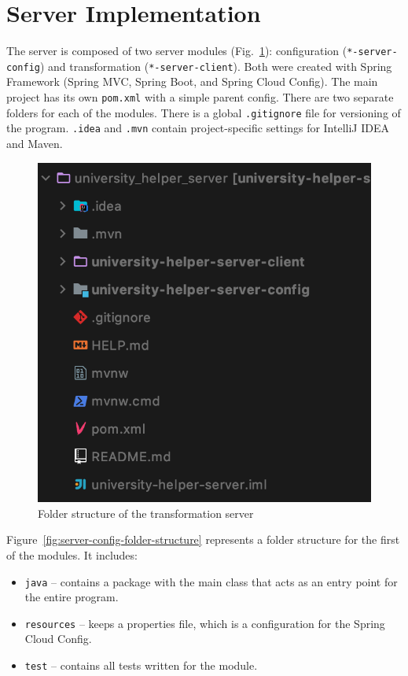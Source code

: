

\section{Server Implementation}
The server is composed of two server modules (Fig.~\ref{fig:server-folder-structure}): configuration (\texttt{*-server-config}) and transformation (\texttt{*-server-client}). Both were created with Spring Framework (Spring MVC, Spring Boot, and Spring Cloud Config). The main project has its own \texttt{pom.xml} with a simple parent config. There are two separate folders for each of the modules. There is a global \texttt{.gitignore} file for versioning of the program. \texttt{.idea} and \texttt{.mvn} contain project-specific settings for IntelliJ IDEA and Maven.

\begin{figure}[htb]
    \centering
    \includegraphics[width=.44\linewidth]{fig04/server-folder-structure.png}
    \caption{Folder structure of the transformation server}
    \label{fig:server-folder-structure}
\end{figure}

Figure~\ref{fig:server-config-folder-structure} represents a folder structure for the first of the modules. It includes:
\begin{itemize}
    \item \texttt{java} -- contains a package with the main class that acts as an entry point for the entire program.
    \item \texttt{resources} -- keeps a properties file, which is a configuration for the Spring Cloud Config.
    \item \texttt{test} -- contains all tests written for the module.
\end{itemize}


